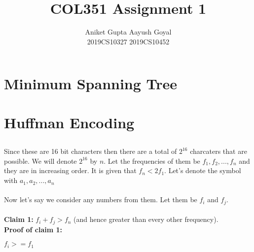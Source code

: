 \documentclass{article}
\title{COL351 Assignment 1}
\author{Aniket Gupta \hspace{2cm}  Aayush Goyal \\
    2019CS10327 \hspace{2.3cm} 2019CS10452}
\begin{document}
\maketitle

\section{Minimum Spanning Tree}
\subsection{}
\subsection{}

\section{Huffman Encoding}
\subsection{}
\subsection{}

Since these are 16 bit characters then there are a total of $2^{16}$ charcaters that are possible. We will denote $2^{16}$ by $n$. Let the frequencies of them be $f_1, f_2, ... , f_n$ and they are in increasing order. It is given that $f_n < 2f_1$. Let's denote the symbol with $a_1, a_2, ... ,a_n$
\\\\
Now let's say we consider any numbers from them. Let them be $f_i$ and $f_j$. 
\\\\
\textbf{Claim 1:} $f_i+f_j > f_n$ (and hence greater than every other frequency).
\\ 
\textbf{Proof of claim 1:}

$f_i >= f_1$
\end{document}
